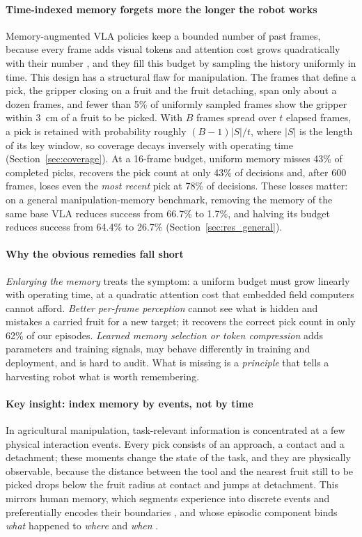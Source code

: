 \paragraph{Time-indexed memory forgets more the longer the robot works} Memory-augmented VLA policies keep a bounded number of past frames, because every frame adds visual tokens and attention cost grows quadratically with their number \citep{vaswani2017attention}, and they fill this budget by sampling the history uniformly in time. This design has a structural flaw for manipulation. The frames that define a pick, the gripper closing on a fruit and the fruit detaching, span only about a dozen frames, and fewer than 5\% of uniformly sampled frames show the gripper within 3~cm of a fruit to be picked. With $B$ frames spread over $t$ elapsed frames, a pick is retained with probability roughly $(B-1)|S|/t$, where $|S|$ is the length of its key window, so coverage decays inversely with operating time (Section~\ref{sec:coverage}). At a 16-frame budget, uniform memory misses 43\% of completed picks, recovers the pick count at only 43\% of decisions and, after 600 frames, loses even the \emph{most recent} pick at 78\% of decisions. These losses matter: on a general manipulation-memory benchmark, removing the memory of the same base VLA reduces success from 66.7\% to 1.7\%, and halving its budget reduces success from 64.4\% to 26.7\% (Section~\ref{sec:res_general}).

\paragraph{Why the obvious remedies fall short} \emph{Enlarging the memory} treats the symptom: a uniform budget must grow linearly with operating time, at a quadratic attention cost that embedded field computers cannot afford. \emph{Better per-frame perception} cannot see what is hidden and mistakes a carried fruit for a new target; it recovers the correct pick count in only 62\% of our episodes. \emph{Learned memory selection or token compression} adds parameters and training signals, may behave differently in training and deployment, and is hard to audit. What is missing is a \emph{principle} that tells a harvesting robot what is worth remembering.

\paragraph{Key insight: index memory by events, not by time} In agricultural manipulation, task-relevant information is concentrated at a few physical interaction events. Every pick consists of an approach, a contact and a detachment; these moments change the state of the task, and they are physically observable, because the distance between the tool and the nearest fruit still to be picked drops below the fruit radius at contact and jumps at detachment. This mirrors human memory, which segments experience into discrete events and preferentially encodes their boundaries \citep{zacks2007event}, and whose episodic component binds \emph{what} happened to \emph{where} and \emph{when} \citep{tulving1972episodic,clayton1998episodic}.

